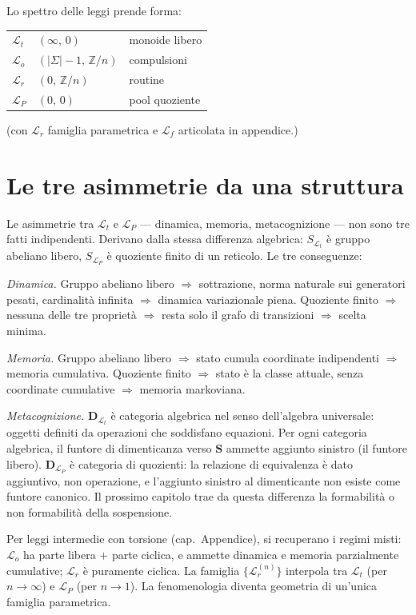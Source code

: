 \documentclass[
    oneside,                 %
    openany,                 %
    titlepage,
    11pt,
    a4paper,
    italian,
    DIV=14,                  %
    headinclude,
    footinclude=true,
    cleardoublepage=empty
]{scrbook}
\theoremstyle{ctplain}
\theoremstyle{ctdef}
\theoremstyle{ctrem}
\newcommand{\Lt}{\mathcal{L}_t}
\newcommand{\LP}{\mathcal{L}_P}
\newcommand{\Lo}{\mathcal{L}_o}
\newcommand{\Lr}{\mathcal{L}_r}
\newcommand{\Lf}{\mathcal{L}_f}
\begin{document}
Lo spettro delle leggi prende forma:
\begin{center}
\begin{tabular}{lll}
$\Lt$    &  $(\infty,\,0)$              &  monoide libero \\
$\Lo$    &  $(|\Sigma|-1,\,\mathbb{Z}/n)$    &  compulsioni \\
$\Lr$    &  $(0,\,\mathbb{Z}/n)$            &  routine \\
$\LP$    &  $(0,\,0)$                   &  pool quoziente \\
\end{tabular}
\end{center}

(con $\Lr$ famiglia parametrica e $\Lf$ articolata in appendice.)

\section*{Le tre asimmetrie da una struttura}

Le asimmetrie tra $\Lt$ e $\LP$ --- dinamica, memoria, metacognizione --- non sono tre fatti indipendenti. Derivano dalla stessa differenza algebrica: $S_{\Lt}$ è gruppo abeliano libero, $S_{\LP}$ è quoziente finito di un reticolo. Le tre conseguenze:

\emph{Dinamica.} Gruppo abeliano libero $\Rightarrow$ sottrazione, norma naturale sui generatori pesati, cardinalità infinita $\Rightarrow$ dinamica variazionale piena. Quoziente finito $\Rightarrow$ nessuna delle tre proprietà $\Rightarrow$ resta solo il grafo di transizioni $\Rightarrow$ scelta minima.

\emph{Memoria.} Gruppo abeliano libero $\Rightarrow$ stato cumula coordinate indipendenti $\Rightarrow$ memoria cumulativa. Quoziente finito $\Rightarrow$ stato è la classe attuale, senza coordinate cumulative $\Rightarrow$ memoria markoviana.

\emph{Metacognizione.} $\mathbf{D}_{\Lt}$ è categoria algebrica nel senso dell'algebra universale: oggetti definiti da operazioni che soddisfano equazioni. Per ogni categoria algebrica, il funtore di dimenticanza verso $\mathbf{S}$ ammette aggiunto sinistro (il funtore libero). $\mathbf{D}_{\LP}$ è categoria di quozienti: la relazione di equivalenza è dato aggiuntivo, non operazione, e l'aggiunto sinistro al dimenticante non esiste come funtore canonico. Il prossimo capitolo trae da questa differenza la formabilità o non formabilità della sospensione.

Per leggi intermedie con torsione (cap.~Appendice), si recuperano i regimi misti: $\Lo$ ha parte libera $+$ parte ciclica, e ammette dinamica e memoria parzialmente cumulative; $\Lr$ è puramente ciclica. La famiglia $\{\Lr^{(n)}\}$ interpola tra $\Lt$ (per $n \to \infty$) e $\LP$ (per $n \to 1$). La fenomenologia diventa geometria di un'unica famiglia parametrica.
\end{document}
